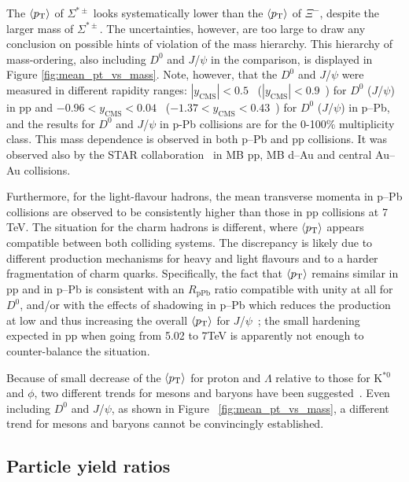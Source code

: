The $\langle p_{\mathrm{T}}\rangle$ of $\Sigma^{*\pm}$ looks systematically lower than the $\langle p_{\mathrm{T}}\rangle$ of $\Xi^{-}$, despite the larger mass of 
$\Sigma^{*\pm}$. The uncertainties, however, are too large to draw any conclusion on 
possible hints of violation of the mass hierarchy. This hierarchy of mass-ordering, also including $D^0$ and 
$J$/$\psi$ in the comparison, is displayed in Figure \ref{fig:mean_pt_vs_mass}. Note, however, that the $D^0$ and $J$/$\psi$ were 
measured in different rapidity ranges: $|y_{\mathrm{CMS}}|<0.5$~\cite{cite:D0} ($|y_{\mathrm{CMS}}|<0.9$~\cite{cite:Jpsi_pp}) for $D^0$ ($J$/$\psi$) in pp and $-0.96 < y_{\mathrm{CMS}}< 0.04$~\cite{cite:D0} ($-1.37<y_{\mathrm{CMS}}<0.43$~\cite{cite:Jpsi_pPb}) for $D^0$ ($J$/$\psi$) in p--Pb, and the results for $D^0$ and $J$/$\psi$ in p-Pb collisions are for the 0-100\% multiplicity class. This mass dependence is observed in both p--Pb and pp collisions. 
It was observed also by the STAR collaboration~\cite{cite:STAR-hadronic_resonances-dAu} in MB pp, MB d--Au and central Au--Au collisions. 

Furthermore, for the light-flavour hadrons, the mean transverse momenta in p--Pb collisions are observed to be consistently higher than those in pp collisions at 7 TeV. The situation for the charm hadrons is different, where $\langle p_{\mathrm{T}}\rangle$ appears compatible between both colliding systems. The discrepancy is likely due to different production mechanisms for heavy and light flavours and to a harder fragmentation of charm quarks. Specifically, the fact that $\langle p_{\mathrm{T}}\rangle$ remains similar in pp and in p--Pb is consistent with an $R_{\mathrm{pPb}}$ ratio compatible with unity at all \pt \cite{cite:D0} for $D^0$, and/or 
with the effects of shadowing in p--Pb which reduces the production at low \pt and thus increasing the overall $\langle p_{\mathrm{T}}\rangle$ for $J$/$\psi$~\cite{cite:Jpsi_pPb}; the small \pt hardening expected in pp when going from 5.02 to 7TeV is apparently not enough to counter-balance the situation.

Because of small decrease of the $\langle p_{\mathrm{T}}\rangle$ for proton and $\Lambda$ relative to those for K$^{*0}$ and $\phi$, two different trends for mesons and baryons have been suggested~\cite{cite:mass_scaling}. Even including $D^0$ and $J$/$\psi$, as shown in Figure ~\ref{fig:mean_pt_vs_mass}, a different trend for 
mesons and baryons cannot be convincingly established.


\newpage
\subsection{Particle yield ratios}
